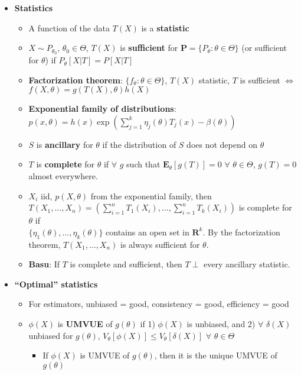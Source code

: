 \documentclass[12pt,english]{article}
\begin{document}
\begin{itemize}
	\item \textbf{Statistics}
	\begin{itemize}
		\item A function of the data $T(X)$ is a \textbf{statistic}
		\item $X \sim P_{\theta_{0}}$, $\theta_{0} \in \Theta$, $T(X)$ is \textbf{sufficient} for $\textbf{P} = \{ P_{\theta} : \theta \in \Theta \}$ (or sufficient for $\theta$) if $P_{\theta}[X | T] = P[X | T]$
		\item \textbf{Factorization theorem}: $\{ f_{\theta} : \theta \in \Theta \}$, $T(X)$ statistic, $T$ is sufficient $\Leftrightarrow$ $f(X, \theta) = g(T(X), \theta) h(X)$
		\item \textbf{Exponential family of distributions}: \\$p(x, \theta) = h(x) \exp( \sum_{j=1}^{k} \eta_{j}(\theta) T_{j}(x) - \beta(\theta))$
		\item $S$ is \textbf{ancillary} for $\theta$ if the distribution of $S$ does not depend on $\theta$
		\item $T$ is \textbf{complete} for $\theta$ if $\forall$ $g$ such that $\mathbf{E}_{\theta}[g(T)] = 0$ $\forall$ $\theta \in \Theta$, $g(T) = 0$ almost everywhere.
		\item $X_{i}$ iid, $p(X, \theta)$ from the exponential family, then \\$T(X_{1}, \ldots, X_{n}) = \left( \sum_{i=1}^{n} T_{1}(X_{i}), \ldots, \sum_{i=1}^{n} T_{k}(X_{i}) \right)$ is complete for $\theta$ if \\$\{ \eta_{1}(\theta), \ldots, \eta_{k}(\theta) \}$ contains an open set in $\mathbf{R}^{k}$. By the factorization theorem, $T(X_{1}, \ldots, X_{n})$ is always sufficient for $\theta$.
		\item \textbf{Basu}: If $T$ is complete and sufficient, then $T \perp$ every ancillary statistic.
	\end{itemize}
	\item \textbf{``Optimal'' statistics}
	\begin{itemize}
		\item For estimators, unbiased = good, consistency = good, efficiency = good
		\item $\phi(X)$ is \textbf{UMVUE} of $g(\theta)$ if 1) $\phi(X)$ is unbiased, and 2) $\forall$ $\delta(X)$ unbiased for $g(\theta)$, $V_{\theta}[\phi(X)] \leq V_{\theta}[\delta(X)]$ $\forall$ $\theta \in \Theta$
		\begin{itemize}
			\item If $\phi(X)$ is UMVUE of $g(\theta)$, then it is the unique UMVUE of $g(\theta)$

\end{itemize}
\end{itemize}
\end{itemize}
\end{document}

